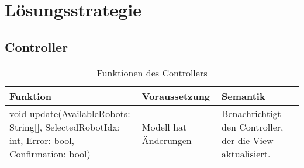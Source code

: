 \chapter{Lösungsstrategie}

\section{Controller}

\begin{table}[h!]
    \centering
    \begin{tabular}{|p{5cm}|p{5cm}|p{5cm}|}
        \hline
        \textbf{Funktion} & \textbf{Voraussetzung} & \textbf{Semantik} \\
        \hline
        void update(AvailableRobots: String[], SelectedRobotIdx: int, Error: bool, Confirmation: bool) & Modell hat Änderungen & Benachrichtigt den Controller, der die View aktualisiert. \\
        \hline
    \end{tabular}
    \caption{Funktionen des Controllers}
    \label{tab:Controller}
\end{table}

\clearpage
